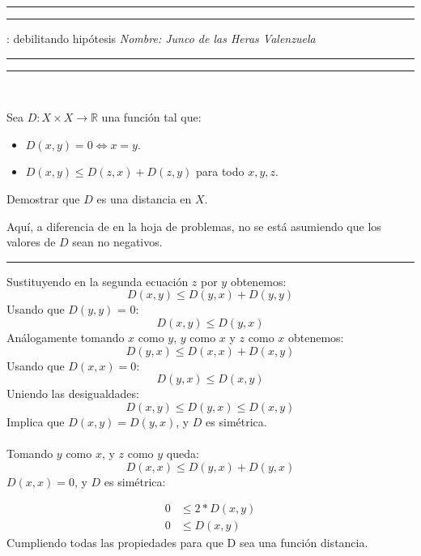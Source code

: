 \documentclass[12pt]{article}
\newcommand{\RR}{\mathbb{R}} %
\begin{document}
\hrule\hrule
\vspace{2mm}


\vspace{3mm}

 : debilitando hipótesis\hfill {\it 
 Nombre: Junco de las Heras Valenzuela}

\vspace{2mm}

\hrule\hrule

\vspace{2mm}

\

 Sea $D:X\times X\to \RR$ una función tal que:
\begin{itemize}
	\item $D(x,y)=0 \iff x = y$.
	\item $D(x,y) \leq D(z,x) + D(z,y)$ para todo $x,y,z$.
\end{itemize}
Demostrar que $D$ es una distancia en $X$.

Aquí, a diferencia de en la hoja de problemas, no se está asumiendo que los valores de $D$ sean no negativos.

\vspace{2mm}
\hrule
\vspace{2mm}


\noindent Sustituyendo en la segunda ecuación $z$ por $y$ obtenemos:
\[
D(x, y) \leq D(y, x) + D(y, y)
\] 
Usando que $D(y, y)$ = 0:
\[
D(x, y) \leq D(y, x)
\]
Análogamente tomando $x$ como $y$, $y$ como $x$ y $z$ como $x$ obtenemos:
\[D(y, x) \leq D(x, x) + D(x, y)
\]
Usando que $D(x, x) = 0$:
\[
D(y, x) \leq D(x, y)
\]
Uniendo las desigualdades:
\[
D(x, y) \leq D(y, x) \leq D(x, y)
\]
Implica que $D(x, y) = D(y, x)$, y $D$ es simétrica.\\\\
Tomando $y$ como $x$, y $z$ como $y$ queda:
\[
D(x, x) \leq D(y, x) + D(y, x)
\]
$D(x, x) = 0$, y $D$ es simétrica:

\[
\begin{aligned}
	0 &\leq 2*D(x, y) \\
	0 &\leq D(x, y)	
\end{aligned}
\]
Cumpliendo todas las propiedades para que D sea una función distancia.

 
 
\end{document}
